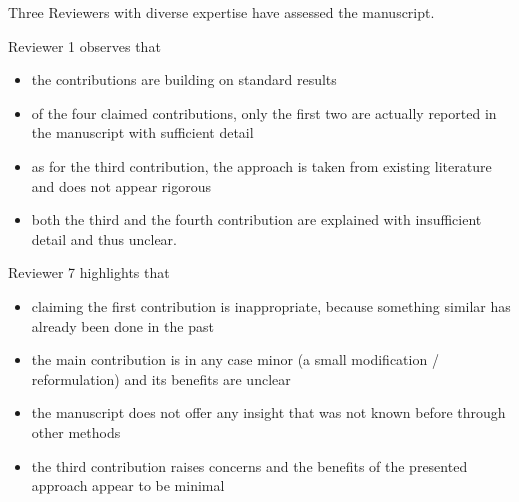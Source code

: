 \vspace{-5pt}
Three Reviewers with diverse expertise have assessed the manuscript.

Reviewer 1 observes that
\vspace{-7pt}
\begin{itemize}[nosep]
    \item {%
        the contributions are building on standard results
    }%
    \item{%
        of the four claimed contributions, only the first two are actually reported in the manuscript with sufficient detail
    }%
    \item{%
        as for the third contribution, the approach is taken from existing literature and does not appear rigorous
    }%
    \item{%
        both the third and the fourth contribution are explained with insufficient detail and thus unclear.
    }%
\end{itemize}

Reviewer 7 highlights that
\vspace{-7pt}
\begin{itemize}[nosep]
    \item {%
        claiming the first contribution is inappropriate, because something similar has already been done in the past
    }%
    \item{%
        the main contribution is in any case minor (a small modification / reformulation) and its benefits are unclear
    }%
    \item{%
        the manuscript does not offer any insight that was not known before through other methods
    }%
    \item{%
        the third contribution raises concerns and the benefits of the presented approach appear to be minimal
    }%
\end{itemize}


